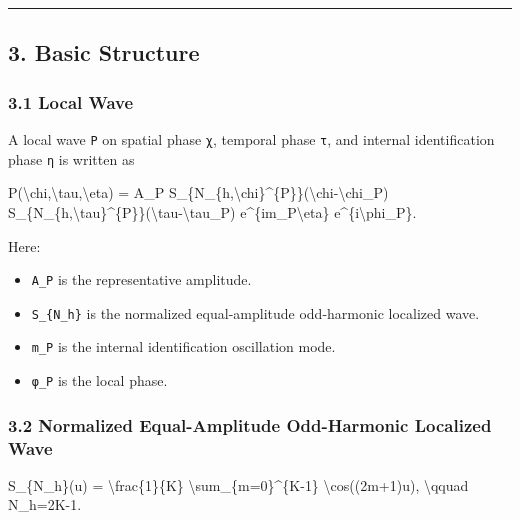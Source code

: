 \documentclass[
  a4paper,
]{article}
\newenvironment{Shaded}{}{}
\newcommand{\NormalTok}[1]{#1}
\providecommand{\tightlist}{%
  \setlength{\itemsep}{0pt}\setlength{\parskip}{0pt}}
\begin{document}
\begin{center}\rule{0.5\linewidth}{0.5pt}\end{center}

\subsection{3. Basic Structure}\label{basic-structure}

\subsubsection{3.1 Local Wave}\label{local-wave}

A local wave \texttt{P} on spatial phase \texttt{χ}, temporal phase
\texttt{τ}, and internal identification phase \texttt{η} is written as

\begin{Shaded}
\begin{Highlighting}[]
\NormalTok{P(\textbackslash{}chi,\textbackslash{}tau,\textbackslash{}eta)}
\NormalTok{=}
\NormalTok{A\_P}
\NormalTok{S\_\{N\_\{h,\textbackslash{}chi\}\^{}\{P\}\}(\textbackslash{}chi{-}\textbackslash{}chi\_P)}
\NormalTok{S\_\{N\_\{h,\textbackslash{}tau\}\^{}\{P\}\}(\textbackslash{}tau{-}\textbackslash{}tau\_P)}
\NormalTok{e\^{}\{im\_P\textbackslash{}eta\}}
\NormalTok{e\^{}\{i\textbackslash{}phi\_P\}.}
\end{Highlighting}
\end{Shaded}

Here:

\begin{itemize}
\tightlist
\item
  \texttt{A\_P} is the representative amplitude.
\item
  \texttt{S\_\{N\_h\}} is the normalized equal-amplitude odd-harmonic
  localized wave.
\item
  \texttt{m\_P} is the internal identification oscillation mode.
\item
  \texttt{φ\_P} is the local phase.
\end{itemize}

\subsubsection{3.2 Normalized Equal-Amplitude Odd-Harmonic Localized
Wave}\label{normalized-equal-amplitude-odd-harmonic-localized-wave}

\begin{Shaded}
\begin{Highlighting}[]
\NormalTok{S\_\{N\_h\}(u)}
\NormalTok{=}
\NormalTok{\textbackslash{}frac\{1\}\{K\}}
\NormalTok{\textbackslash{}sum\_\{m=0\}\^{}\{K{-}1\}}
\NormalTok{\textbackslash{}cos((2m+1)u),}
\NormalTok{\textbackslash{}qquad}
\NormalTok{N\_h=2K{-}1.}
\end{Highlighting}
\end{Shaded}
\end{document}
